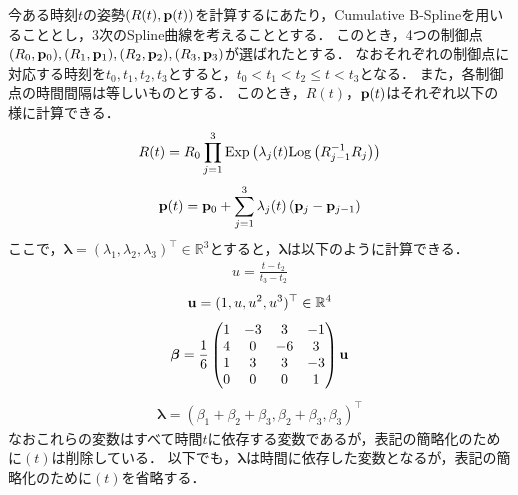 今ある時刻$t$の姿勢$\left( R(t), {\bf p}(t) \right)$を計算するにあたり，Cumulative B-Splineを用いることとし，3次のSpline曲線を考えることとする．
このとき，4つの制御点$(R_{0}, {\bf p}_{0}), (R_{1}, {\bf p}_{1}), (R_{2}, {\bf p}_{2}), (R_{3}, {\bf p}_{3})$が選ばれたとする．
なおそれぞれの制御点に対応する時刻を$t_{0}, t_{1}, t_{2}, t_{3}$とすると，$t_{0} < t_{1} < t_{2} \leq t < t_{3}$となる．
また，各制御点の時間間隔は等しいものとする．
このとき，$R(t)$，${\bf p}(t)$はそれぞれ以下の様に計算できる．
%
\begin{align}
  R(t) = R_{0} \prod_{j=1}^{3} {\rm Exp} \left( \lambda_{j}(t) {\rm Log} \left( R_{j-1}^{-1} R_{j} \right) \right)
  \label{eq:continuous_rotation_matrix}
\end{align}
%
\begin{align}
  {\bf p}(t) = {\bf p}_{0} + \sum_{j=1}^{3} \lambda_{j}(t) \left( {\bf p}_{j} - {\bf p}_{j-1} \right)
  \label{eq:continuous_translation_vector}
\end{align}
%
ここで，$\boldsymbol \lambda = \left( \lambda_{1}, \lambda_{2}, \lambda_{3} \right)^{\top} \in \mathbb{R}^{3}$とすると，$\boldsymbol \lambda$は以下のように計算できる．
%
\begin{align}
  u = \frac{t - t_{2}}{t_{3} - t_{2}}
\end{align}
%
\begin{align}
  {\bf u} = (1, u, u^{2}, u^{3})^{\top} \in \mathbb{R}^{4}
\end{align}
%
\begin{align}
  \boldsymbol \beta = \frac{1}{6}
  \left( \begin{matrix}
    1 & -3 &  3 & -1 \\
    4 &  0 & -6 &  3 \\
    1 &  3 &  3 & -3 \\
    0 &  0 &  0 &  1
  \end{matrix} \right) {\bf u}
  \label{eq:b-spline_basis}
\end{align}
%
\begin{align}
  \boldsymbol \lambda = \left( \beta_{1} + \beta_{2} + \beta_{3}, \beta_{2} + \beta_{3}, \beta_{3} \right)^{\top}
  \label{eq:b-spline_lambda}
\end{align}
%
なおこれらの変数はすべて時間$t$に依存する変数であるが，表記の簡略化のために$(t)$は削除している．
以下でも，$\boldsymbol \lambda$は時間に依存した変数となるが，表記の簡略化のために$(t)$を省略する．

